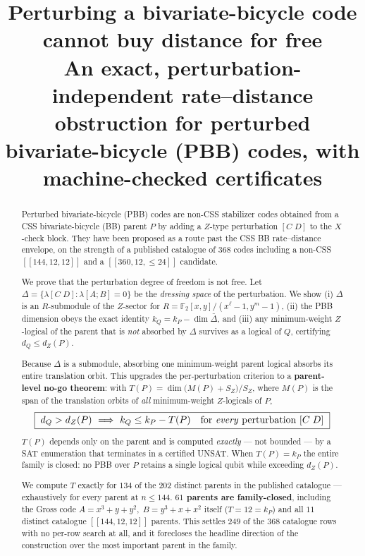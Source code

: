 \documentclass[11pt]{article}
\title{Perturbing a bivariate-bicycle code cannot buy distance for free\\[0.6em]
  \large An exact, perturbation-independent rate--distance obstruction for
  perturbed bivariate-bicycle (PBB) codes, with machine-checked certificates}
\author{}
\date{}
\newcommand{\nk}[1]{[\![#1]\!]}
\theoremstyle{plain}
\theoremstyle{remark}
\begin{document}
\maketitle

\begin{abstract}
Perturbed bivariate-bicycle (PBB) codes are non-CSS stabilizer codes obtained from a CSS
bivariate-bicycle (BB) parent $P$ by adding a $Z$-type perturbation $[C\;D]$ to the
$X$-check block. They have been proposed as a route past the CSS BB rate--distance
envelope, on the strength of a published catalogue of $368$ codes including a non-CSS
$\nk{144,12,12}$ and a $\nk{360,12,\le 24}$ candidate.

We prove that the perturbation degree of freedom is not free. Let
$\Delta=\{\lambda[C\;D] : \lambda[A;B]=0\}$ be the \emph{dressing space} of the perturbation.
We show (i) $\Delta$ is an $R$-submodule of the $Z$-sector for
$R=\mathbb{F}_2[x,y]/(x^{\ell}-1,y^{m}-1)$, (ii) the PBB dimension obeys the exact
identity $k_Q = k_P - \dim\bar\Delta$, and (iii) any minimum-weight $Z$-logical of the
parent that is \emph{not} absorbed by $\Delta$ survives as a logical of $Q$, certifying
$d_Q \le d_Z(P)$.

Because $\Delta$ is a submodule, absorbing one minimum-weight parent logical absorbs its
entire translation orbit. This upgrades the per-perturbation criterion to a
\textbf{parent-level no-go theorem}: with
$T(P)=\dim\big(M(P)+S_Z\big)/S_Z$, where $M(P)$ is the span of the translation orbits of
\emph{all} minimum-weight $Z$-logicals of $P$,
\[
\boxed{\;d_Q > d_Z(P)\ \Longrightarrow\ k_Q \le k_P - T(P)\quad\text{for \emph{every} perturbation } [C\;D]\;}
\]
$T(P)$ depends only on the parent and is computed \emph{exactly} --- not bounded --- by a SAT
enumeration that terminates in a certified UNSAT. When $T(P)=k_P$ the entire family is
closed: no PBB over $P$ retains a single logical qubit while exceeding $d_Z(P)$.

We compute $T$ exactly for $134$ of the $202$ distinct parents in the published
catalogue --- exhaustively for every parent at $n\le 144$. \textbf{$61$ parents are family-closed}, including the Gross code
$A=x^3+y+y^2,\;B=y^3+x+x^2$ itself ($T=12=k_P$) and all $11$ distinct catalogue
$\nk{144,12,12}$ parents. This settles $249$ of the $368$ catalogue rows with no per-row
search at all, and it forecloses the headline direction of the construction over the
most important parent in the family.


\end{abstract}
\end{document}
